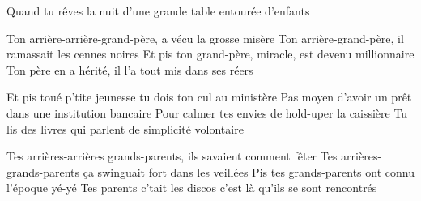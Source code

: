 Quand tu rêves la nuit d'une grande table entourée d'enfants
\endverse

\beginverse
Ton arrière-arrière-grand-père, a vécu la grosse misère
Ton arrière-grand-père, il ramassait les cennes noires
Et pis ton grand-père, miracle, est devenu millionnaire
Ton père en a hérité, il l'a tout mis dans ses réers
\endverse

\beginverse
Et pis toué p'tite jeunesse tu dois ton cul au ministère
Pas moyen d'avoir un prêt dans une institution bancaire
Pour calmer tes envies de hold-uper la caissière
Tu lis des livres qui parlent de simplicité volontaire
\endverse

\beginverse
Tes arrières-arrières grands-parents, ils savaient comment fêter
Tes arrières-grands-parents ça swinguait fort dans les veillées
Pis tes grands-parents ont connu l'époque yé-yé
Tes parents c'tait les discos c'est là qu'ils se sont rencontrés
\]\]\]\]\]\]\]\]\]\]\]\]\]\]\]\]\]\]\]\]\]\]\]\]\]\]\]\]\]\]\]\]\]\]\]\]\]\]\]\]\]\]\]\]\]\]\]\]\]\]\]\]\]\]\]\]\]\]\]\]\]\]\]\]\]\]\]\]\]\]\]\]\]\]\]\]\]\]\]\]\]\]\]\]\]\]\]\]\]\]\]\]\]\]\]\]\]\]\]\]\]\]\]\]\]\]\]\]\]\]\]\]\]\]\]\]\]\]\]\]\]\]\]\]\]\]\]\]\]\]\]\]\]\]\]\]\]\]\]\]\]\]\]\]\]\]\]\]\]\]\]\]\]\]\]\]\]\]\]\]\]\]\]\]\]\]\]\]\]\]\]\]\]\]\]\]\]\]\]\]\]\]\]\]\]\]\]\]\]\]\]\]\]\]\]\]\]\]\]\]\]\]\]\]\]\]\]\]\]\]\]\]\]\]\]\]\]\]\]\]\]\]\]\]\]\]\]\]\]\]\]\]\]\]\]\]\]\]\]\]\]\]\]\]\]\]\]\]\]\]\]\]\]\]\]\]\]\]\]\]\]\]\]\]\]\]\]\]\]\]\]\]\]\]\]\]\]\]\]\]\]\]\]\]\]\]\]\]\]\]\]\]\]\]\]\]\]\]\]\]\]\]\]\]\]\]\]\]\]\]\]\]\]\]\]\]\]\]\]\]\]\]\]\]\]\]\]\]\]\]\]\]\]\]\]\]\]\]\]\]\]\]\]\]\]\]\]\]\]\]\]\]\]\]\]\]\]\]\]\]\]\]\]\]\]\]\]\]\]\]\]\]\]\]\]\]\]\]\]\]\]\]\]\]\]\]\]\]\]\]\]\]\]\]\]\]\]\]\]\]\]\]\]\]\]\]\]\]\]\]\]\]\]\]\]\]\]\]\]\]\]\]\]\]\]\]\]\]\]\]\]\]\]\]\]\]\]\]\]\]\]\]\]\]\]\]\]\]\]\]\]\]\]\]\]\]\]\]\]\]\]\]\]\]\]\]\]\]\]\]\]\]\]\]\]\]\]\]\]\]\]\]\]\]\]\]\]\]\]\]\]\]\]\]\]\]\]\]\]\]\]\]\]\]\]\]\]\]\]\]\]\]\]\]\]\]\]\]\]\]\]\]\]\]\]\]\]\]\]\]\]\]\]\]\]\]\]\]\]\]\]\]\]\]\]\]\]\]\]\]\]\]\]\]\]\]\]\]\]\]\]\]\]\]\]\]\]\]\]\]\]\]\]\]\]\]\]\]\]\]\]\]\]\]\]\]\]\]\]\]\]\]\]\]\]\]\]\]\]\]\]\]\]\]\]\]\]\]\]\]\]\]\]\]\]\]\]\]\]\]\]\]\]\]\]\]\]\]\]\]\]\]\]\]\]\]\]\]\]\]\]\]\]\]\]\]\]\]\]\]\]\]\]\]\]\]\]\]\]\]\]\]\]\]\]\]\]\]\]\]\]\]\]\]\]\]\]\]\]\]\]\]\]\]\]\]\]\]\]\]\]\]\]\]\]\]\]\]\]\]\]\]\]\]\]\]\]\]\]\]\]\]\]\]\]\]\]\]\]\]\]\]\]\]\]\]\]\]\]\]\]\]\]\]\]\]\]\]\]\]\]\]\]\]\]\]\]\]\]\]\]\]\]\]\]\]\]\]\]\]\]\]\]\]\]\]\]\]\]\]\]\]\]\]\]\]\]\]\]\]\]\]\]\]\]\]\]\]\]\]\]\]\]\]\]\]\]\]\]\]\]\]\]\]\]\]\]\]\]\]\]\]\]\]\]\]\]\]\]\]\]\]\]\]\]\]\]\]\]\]\]\]\]\]\]\]\]\]\]\]\]\]\]\]\]\]\]\]\]\]\]\]\]\]\]\]\]\]\]\]\]\]\]\]\]\]\]\]\]\]\]\]\]\]\]\]\]\]\]\]\]\]\]\]\]\]\]\]\]\]\]\]\]\]\]\]\]\]\]\]\]\]\]\]\]\]\]\]\]\]\]\]\]\]\]\]\]\]\]\]\]\]\]\]\]\]\]\]\]\]\]\]\]\]\]\]\]\]\]\]\]\]\]\]\]\]\]\]\]\]\]\]\]\]\]\]\]\]\]\]\]\]\]\]\]\]\]\]\]\]\]\]\]\]\]\]\]\]\]\]\]\]\]\]\]\]\]\]\]\]\]\]\]\]\]\]\]\]\]\]\]\]\]\]\]\]\]\]\]\]\]\]\]\]\]\]\]\]\]\]\]\]\]\]\]\]\]\]\]\]\]\]\]\]\]\]\]\]\]\]\]\]\]\]\]\]\]\]\]\]\]\]\]\]\]\]\]\]\]\]\]\]\]\]\]\]\]\]\]\]\]\]\]\]\]\]\]\]\]\]\]\]\]\]\]\]\]\]\]\]\]\]\]\]\]\]\]\]\]\]\]\]\]\]\]\]\]\]\]\]\]\]\]\]\]\]\]\]\]\]\]\]\]\]\]\]\]\]\]\]\]\]\]\]\]\]\]\]\]\]\]\]\]\]\]\]\]\]\]\]\]\]\]\]\]\]\]\]\]\]\]\]\]\]\]\]\]\]\]\]\]\]\]\]\]\]\]\]\]\]\]\]\]\]\]\]\]\]\]\]\]\]\]\]\]\]\]\]\]\]\]\]\]\]\]\]\]\]\]\]\]\]\]\]\]\]\]\]\]\]\]
